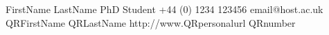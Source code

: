 \documentclass{ecr_card}
\begin{document}
\vcardfront
	{FirstName}
	{LastName}
	{PhD Student}
	{+44 (0) 1234 123456}
	{email@host.ac.uk}
	{QRFirstName}
	{QRLastName}
	{http://www.QRpersonalurl}
	{QRnumber}
\vcardback{}
\end{document}
